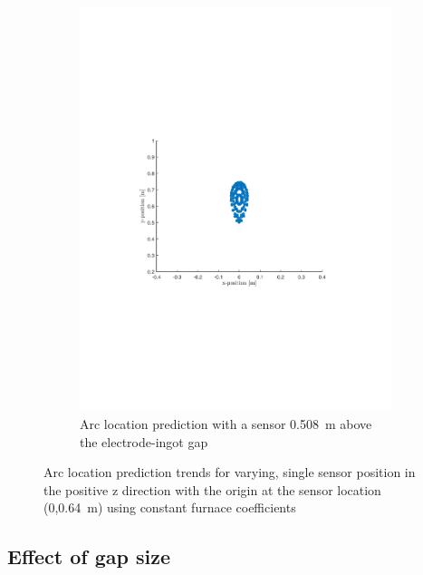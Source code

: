 \documentclass[onehalf,11pt]{beavtex}
\begin{document}
\begin{figure}[htbp]
\begin{subfigure}[b]{0.495\textwidth}
	\includegraphics[width=\textwidth]{sh4.pdf}
	\caption{Arc location prediction with a sensor \SI{0.508}{\meter} above the electrode-ingot gap}
	\end{subfigure}
\caption{Arc location prediction trends for varying, single sensor position in the positive z direction with the origin at the sensor location (0,\SI{0.64}{\meter}) using constant furnace coefficients}
\label{fig:trends}
\end{figure}

\subsection{Effect of gap size}
\label{sec:gap_size}
\end{document}
